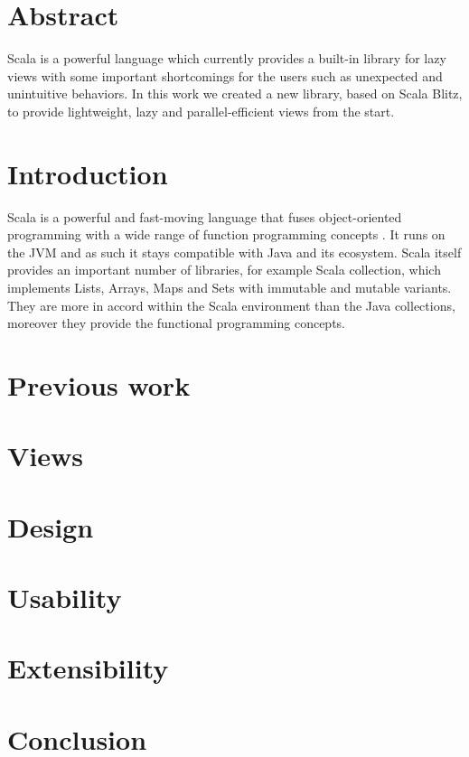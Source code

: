 \documentclass[a4paper,12pt,twocolumn]{article}
\begin{document}
\section*{Abstract}
Scala is a powerful language which currently provides a built-in library for lazy views with some important shortcomings for the users such as unexpected and unintuitive behaviors.
In this work we created a new library, based on Scala Blitz, to provide lightweight, lazy and parallel-efficient views from the start.

\section{Introduction}
Scala is a powerful and fast-moving language that fuses object-oriented programming with a wide range of function programming concepts \cite{scala-overview}.
It runs on the JVM and as such it stays compatible with Java and its ecosystem.
Scala itself provides an important number of libraries, for example Scala collection, which implements Lists, Arrays, Maps and Sets with immutable and mutable variants.
They are more in accord within the Scala environment than the Java collections, moreover they provide the functional programming concepts.

\lipsum[1]

\section{Previous work}
\lipsum[2]

\section{Views}
\lipsum[3]

\section{Design}
\lipsum[4]

\section{Usability}
\lipsum[5]

\section{Extensibility}
\lipsum[6]

\section{Conclusion}
\lipsum[7]

{}

\end{document}
